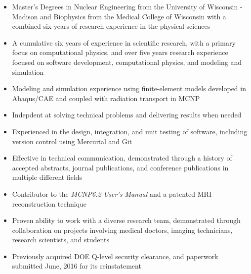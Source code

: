   \begin{itemize}[leftmargin=.9in,rightmargin=.875in,itemsep=1.6mm]

	\item Master's Degrees in Nuclear Engineering from the University of Wisconsin - Madison and Biophysics from the Medical College of Wisconsin with a combined six years of research experience in the physical sciences
		
	\item A cumulative six years of experience in scientific research, with a primary focus on computational physics, and over five years research experience focused on software development, computational physics, and modeling and simulation
	
	\item Modeling and simulation experience using finite-element models developed in Abaqus/CAE and coupled with radiation transport in \textsc{MCNP}
		
	\item Indepdent at solving technical problems and delivering results when needed
	\item Experienced in the design, integration, and unit testing of software, including version control using Mercurial and Git
		
	\item Effective in technical communication, demonstrated through a history of accepted abstracts, journal publications, and conference publications in multiple different fields
	\item Contributor to the \textit{MCNP6.2 User's Manual} and a patented MRI reconstruction technique
	
	\item Proven ability to work with a diverse research team, demonstrated through collaboration on projects involving medical doctors, imaging technicians, research scientists, and students
		
	\item Previously acquired DOE Q-level security clearance, and paperwork submitted June, 2016 for its reinstatement
  \end{itemize} 

